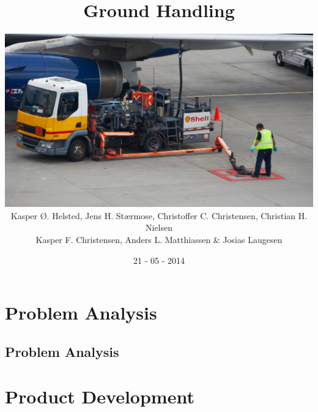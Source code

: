 \documentclass[12pt,a4paper]{report}
\title{Ground Handling}
\author{
    \includegraphics[width=14cm]{grafik/index} \\
        Kasper Ø. Helsted, Jens H. Stærmose, Christoffer C. Christensen, Christian H. Nielsen\\
        Kasper F. Christensen, Anders L. Matthiassen \& Josias Laugesen\\
}
\date{21 - 05 - 2014}
\begin{document}
    \maketitle
    \afterpage{\null\newpage}
    \clearpage  
    
    \afterpage{\null\newpage}
    \clearpage  
    
    \tableofcontents
    \thispagestyle{empty}
    \clearpage
    \setcounter{page}{1}
    
    \part{Problem Analysis}
    \chapter{Problem Analysis}

    
    
    
    
    
    

    \part{Product Development}
    
    \printbibliography
\end{document}
